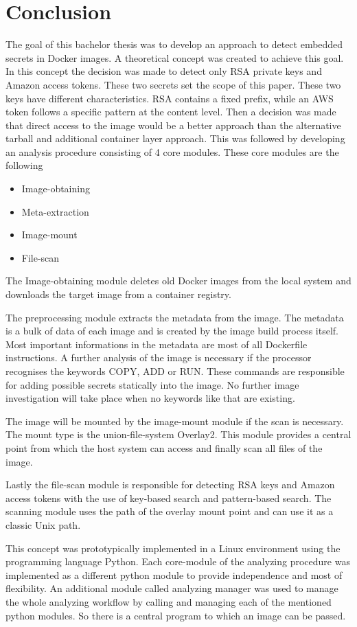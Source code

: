 \chapter{Conclusion}
\label{ch:end:conclusion}
The goal of this bachelor thesis was to develop an approach to detect embedded secrets in Docker images. 
A theoretical concept was created to achieve this goal. In this concept the decision was made to detect only RSA private keys and Amazon access tokens.
These two secrets set the scope of this paper. These two keys have different characteristics.
RSA contains a fixed prefix, while an AWS token follows a specific pattern at the content level.
Then a decision was made that direct access to the image would be a better approach than the alternative tarball and additional container layer approach.
This was followed by developing an analysis procedure consisting of 4 core modules.
These core modules are the following
\begin{itemize}
\item Image-obtaining
\item Meta-extraction
\item Image-mount
\item File-scan
\end{itemize}
The Image-obtaining module deletes old Docker images from the local system and downloads the target image from a container registry.

The preprocessing module extracts the metadata from the image. 
The metadata is a bulk of data of each image and is created by the image build process itself.
Most important informations in the metadata are most of all Dockerfile instructions.
A further analysis of the image is necessary if the processor recognises the keywords COPY, ADD or RUN.
These commands are responsible for adding possible secrets statically into the image. 
No further image investigation will take place when no keywords like that are existing. 

The image will be mounted by the image-mount module if the scan is necessary. The mount type is the union-file-system Overlay2.
This module provides a central point from which the host system can access and finally scan all files of the image.

Lastly the file-scan module is responsible for detecting RSA keys and Amazon access tokens with the use of key-based search and pattern-based search.
The scanning module uses the path of the overlay mount point and can use it as a classic Unix path.

This concept was prototypically implemented in a Linux environment using the programming language Python.
Each core-module of the analyzing procedure was implemented as a different python module to provide independence and most of flexibility. 
An additional module called analyzing manager was used to manage the whole analyzing workflow by calling and managing each of the mentioned python modules.
So there is a central program to which an image can be passed.

